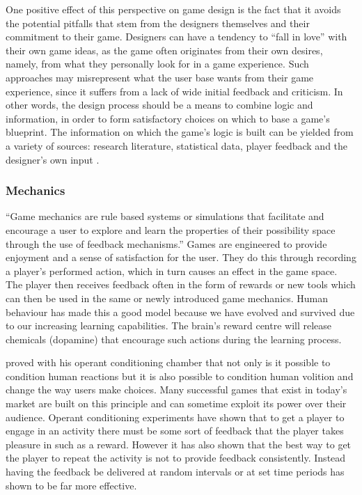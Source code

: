 \documentclass[final]{cmpreport}
\begin{document}
One positive effect of this perspective on game design is the fact that it avoids the potential pitfalls that stem from the designers themselves and their commitment to their game. Designers can have a tendency to ``fall in love'' with their own game ideas, as the game often originates from their own desires, namely, from what they personally look for in a game experience. Such approaches may misrepresent what the user base wants from their game experience, since it suffers from a lack of wide initial feedback and criticism. In other words, the design process should be a means to combine logic and information, in order to form satisfactory choices on which to base a game's blueprint. The information on which the game's logic is built can be yielded from a variety of sources: research literature, statistical data, player feedback and the designer's own input \cite{ErmiMayra}.



\subsubsection{Mechanics}
``Game mechanics are rule based systems or simulations that facilitate and encourage a user to explore and learn the properties of their possibility space through the use of feedback mechanisms.''\cite{Koster} Games are engineered to provide enjoyment and a sense of satisfaction for the user. They do this through recording a player's performed action, which in turn causes an effect in the game space. The player then receives feedback often in the form of rewards or new tools which can then be used in the same or newly introduced game mechanics. Human behaviour has made this a good model because we have evolved and survived due to our increasing learning capabilities. The brain's reward centre will release chemicals (dopamine) that encourage such actions during the learning process.

\cite{Skinner} proved with his operant conditioning chamber that not only is it possible to condition human reactions but it is also possible to condition human volition and change the way users make choices. Many successful games that exist in today's market are built on this principle and can sometime exploit its power over their audience. Operant conditioning experiments have shown that to get a player to engage in an activity there must be some sort of feedback that the player takes pleasure in such as a reward. However it has also shown that the best way to get the player to repeat the activity is not to provide feedback consistently. Instead having the feedback be delivered at random intervals or at set time periods has shown to be far more effective.
\end{document}
